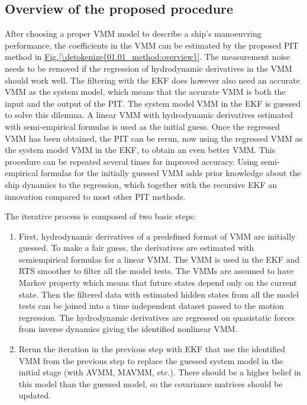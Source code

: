 \documentclass[review]{elsarticle}
\begin{document}
\subsection{Overview of the proposed procedure}
\label{\detokenize{01.01_method:overview-of-the-proposed-procedure}}
\sphinxAtStartPar
After choosing a proper VMM model to describe a ship’s manoeuvring performance, the coefficients in the VMM can be estimated by the proposed PIT method in \hyperref[\detokenize{01.01_method:overview}]{Fig.\@ \ref{\detokenize{01.01_method:overview}}}. 
The measurement noise needs to be removed if the regression of hydrodynamic derivatives in the VMM should work well. The filtering with the EKF does however also need an accurate VMM as the system model, which means that the accurate VMM is both the input and the output of the PIT. The system model VMM in the EKF is guessed to solve this dilemma. A linear VMM with hydrodynamic derivatives estimated with semi-empirical formulas is used as the initial guess. Once the regressed VMM has been obtained, the PIT can be rerun, now using the regressed VMM as the system model VMM in the EKF, to obtain an even better VMM. This procedure can be repeated several times for improved accuracy. Using semi-empirical formulas for the initially guessed VMM adds prior knowledge about the ship dynamics to the regression, which together with the recursive EKF an innovation compared to most other PIT methods.  

The iterative process is composed of two basic steps:
\begin{enumerate}
%
\item {} 
\sphinxAtStartPar
First, hydrodynamic derivatives of a pre\sphinxhyphen{}defined format of VMM are initially guessed. To make a fair guess, the derivatives are estimated with semi\sphinxhyphen{}empirical formulas for a linear VMM. The VMM is used in the EKF and RTS smoother to filter all the model tests. The VMMs are assumed to have Markov property which means that future states depend only on the current state. Then the filtered data with estimated hidden states from all the model tests can be joined into a time independent dataset passed to the motion regression. The hydrodynamic derivatives are regressed on quasi\sphinxhyphen{}static forces from inverse dynamics giving the identified nonlinear VMM.

\item {} 
\sphinxAtStartPar
Re\sphinxhyphen{}run the iteration in the previous step with EKF that use the identified VMM from the previous step to replace the guessed system model in the initial stage (with AVMM, MAVMM, etc.). There should be a higher belief in this model than the guessed model, so the covariance matrices should be updated.

\end{enumerate}
\end{document}

